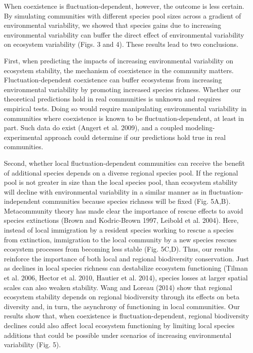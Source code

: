 \documentclass[12pt,]{article}
\begin{document}
When coexistence is fluctuation-dependent, however, the outcome is less
certain. By simulating communities with different species pool sizes
across a gradient of environmental variability, we showed that species
gains due to increasing environmental variability can buffer the direct
effect of environmental variability on ecosystem variability (Figs. 3
and 4). These results lead to two conclusions.

First, when predicting the impacts of increasing environmental
variability on ecosystem stability, the mechanism of coexistence in the
community matters. Fluctuation-dependent coexistence can buffer
ecosystems from increasing environmental variability by promoting
increased species richness. Whether our theoretical predictions hold in
real communities is unknown and requires empirical tests. Doing so would
require manipulating environmental variability in communities where
coexistence is known to be fluctuation-dependent, at least in part. Such
data do exist (Angert et al. 2009), and a coupled modeling-experimental
approach could determine if our predictions hold true in real
communities.

Second, whether local fluctuation-dependent communities can receive the
benefit of additional species depends on a diverse regional species
pool. If the regional pool is not greater in size than the local species
pool, than ecosystem stability will decline with environmental
variability in a similar manner as in fluctuation-independent
communities because species richness will be fixed (Fig. 5A,B).
Metacommunity theory has made clear the importance of rescue effects to
avoid species extinctions (Brown and Kodric-Brown 1997, Leibold et al.
2004). Here, instead of local immigration by a resident species working
to rescue a species from extinction, immigration to the local community
by a new species rescues ecosystem processes from becoming less stable
(Fig. 5C,D). Thus, our results reinforce the importance of both local
and regional biodiversity conservation. Just as declines in local
species richness can destabilize ecosystem functioning (Tilman et al.
2006, Hector et al. 2010, Hautier et al. 2014), species losses at larger
spatial scales can also weaken stability. Wang and Loreau (2014) show
that regional ecosystem stability depends on regional biodiversity
through its effects on beta diversity and, in turn, the asynchrony of
functioning in local communities. Our results show that, when
coexistence is fluctuation-dependent, regional biodiversity declines
could also affect local ecosystem functioning by limiting local species
additions that could be possible under scenarios of increasing
environmental variability (Fig. 5).
\end{document}
